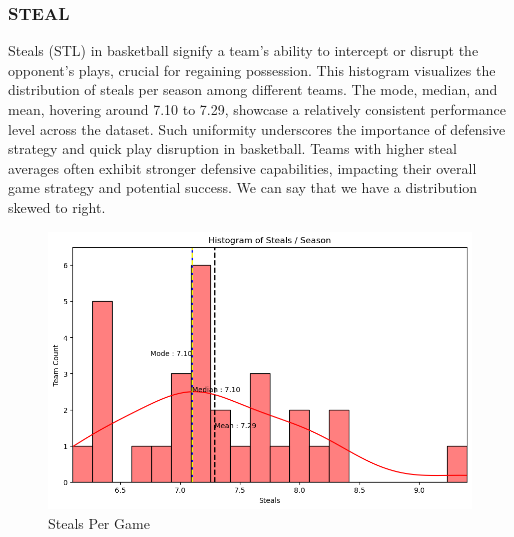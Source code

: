 \documentclass[conference]{IEEEtran}
\begin{document}
\subsubsection{STEAL}
Steals (STL) in basketball signify a team's ability to intercept or disrupt the opponent's plays, crucial for regaining possession. This histogram visualizes the distribution of steals per season among different teams. The mode, median, and mean, hovering around 7.10 to 7.29, showcase a relatively consistent performance level across the dataset. Such uniformity underscores the importance of defensive strategy and quick play disruption in basketball. Teams with higher steal averages often exhibit stronger defensive capabilities, impacting their overall game strategy and potential success. We can say that we have a distribution skewed to right.
\begin{figure}[h]
    \centering
    \includegraphics[scale=0.41]{STEAL_image.png}
    \caption{Steals Per Game}
    \label{fig:enter-label}
\end{figure}
\end{document}
